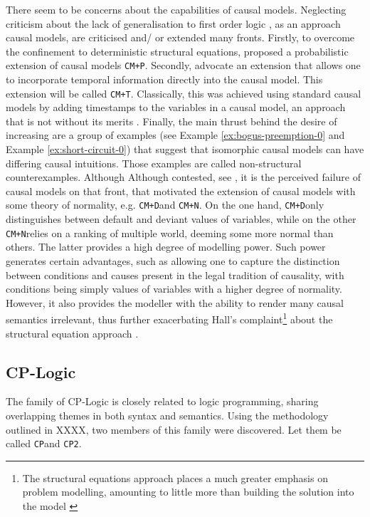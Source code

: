 \documentclass[11pt,a4paper]{book}
\theoremstyle{definition}
\theoremstyle{definition}
\theoremstyle{definition}
\theoremstyle{remark}
\newcommand{\cp}{\texttt{CP}}
\newcommand{\cpp}{\texttt{CP2}}
\newcommand{\cmn}{\texttt{CM+N}}
\newcommand{\cmp}{\texttt{CM+P}}
\newcommand{\cmd}{\texttt{CM+D}}
\newcommand{\cmt}{\texttt{CM+T}}
\begin{document}
There seem to be concerns about the capabilities of causal models. 
Neglecting criticism about the lack of generalisation to first order logic \parencite{batusov2018situation}, as an approach causal models, are criticised and/ or extended many fronts.
Firstly, to overcome the confinement to deterministic structural equations, \parencite{fenton2017proposed} proposed a probabilistic extension of causal models \cmp.
Secondly, \parencite{beckers2018principled} advocate an extension that allows one to incorporate temporal information directly into the causal model. This extension will be called \cmt. Classically, this was achieved using standard causal models by 
adding timestamps to the variables in a causal model, an approach that is not without its merits \parencite{ibeling2018conditional}. 
Finally, the main thrust behind the desire of increasing are a group of examples (see Example \ref{ex:bogus-preemption-0} and Example \ref{ex:short-circuit-0}) that suggest that 
isomorphic causal models can have differing causal intuitions. Those examples are called non-structural counterexamples. Although
Although contested, see \parencite{blanchard2017cause}, it is the perceived failure of causal models on that front, that motivated the extension of causal models with some theory of normality, e.g.  \cmd and \cmn. 
On the one hand, \cmd only distinguishes between default and deviant values of variables, while on the other \cmn relies on a ranking of multiple world, deeming some more normal than others.
The latter provides a high degree of modelling power. Such power generates certain advantages, such as allowing one to capture the distinction between conditions and causes present in the legal tradition of causality, with conditions being simply values of variables with a higher degree of normality. However, it also provides the modeller with the ability to render many causal semantics irrelevant, thus further exacerbating Hall's complaint\footnote{The structural equations approach places a much greater emphasis on problem modelling, amounting to little more than building the solution into the model \cite{erwig2010causal}} about the structural equation approach \parencite{blanchard2017cause,halpern2015graded,weslake2015partial}. 

\subsection{CP-Logic}
The family of CP-Logic is closely related to logic programming, sharing overlapping themes in both syntax and semantics.
Using the methodology outlined in XXXX, two members of this family were discovered. Let them be called \cp and \cpp \parencite{denecker2019explaining}.
\end{document}
